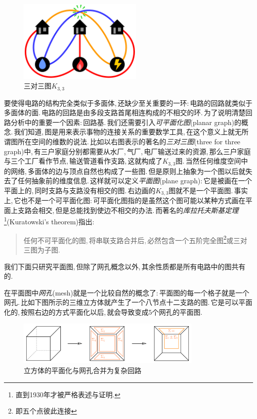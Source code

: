 \begin{figure}
\centering
\includegraphics[width=6cm]{image/7-3-16.png}
\caption{三对三图$K_{3,3}$}
\end{figure}
要使得电路的结构完全类似于多面体,\,还缺少至关重要的一环:\,电路的回路就类似于多面体的面.\,电路的回路是由多段支路首尾相连构成的不相交的环.\,为了说明清楚回路分析中的重要一个因素:\,回路基.\,我们还需要引入\emph{可平面化图}(planar graph)的概念.\,我们知道,\,图是用来表示事物的连接关系的重要数学工具,\,在这个意义上就无所谓图所在空间的维数的说法.\,比如以右图表示的著名的\emph{三对三图}(three for three graph)中,\,有三户家庭分别都需要从水厂,\,气厂,\,电厂输送过来的资源,\,那么三户家庭与三个工厂看作节点,\,输送管道看作支路,\,这就构成了$K_{3,3}$图.\,当然任何维度空间中的网络,\,多面体的边与顶点自然也构成了一些图.\,但是原则上抽象为一个图以后就失去了任何抽象前的维度信息.\,这样就可以定义\emph{平面图}(plane graph):\,它是被画在一个平面上的,\,同时支路与支路没有相交的图.\,右边画的$K_{3,3}$图就不是一个平面图.\,事实上,\,它也不是一个可平面化图:\,可平面化图指的是虽然这个图可能以某种方式画在平面上支路会相交,\,但是总能找到使边不相交的办法.\,而著名的\emph{库拉托夫斯基定理}\footnote{直到1930年才被严格表述与证明.}(Kuratowski's theorem)指出:
\begin{quotation}
任何不可平面化的图,\,将串联支路合并后,\,必然包含一个五阶完全图\footnote{即五个点彼此连接}或三对三图为子图.
\end{quotation}

我们下面只研究平面图,\,但除了网孔概念以外,\,其余性质都是所有电路中的图共有的.

\vspace{0.5cm}
在平面图中\emph{网孔}(mesh)就是一个比较自然的概念了:\,平面图的每一个格子就是一个网孔.\,比如下图所示的三维立方体就产生了一个八节点十二支路的图.\,它是可以平面化的,\,按照右边的方式平面化以后,\,就会导致变成$5$个网孔的平面图.

\begin{figure}[H]
\centering
\includegraphics[width=0.8\textwidth]{image/7-3-17.png}
\caption{立方体的平面化与网孔合并为复杂回路}
\end{figure}

